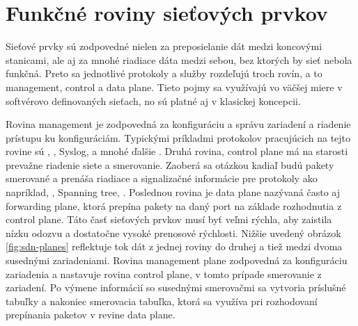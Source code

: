 \section{Funkčné roviny sieťových prvkov}
Sieťové prvky sú zodpovedné nielen za preposielanie dát medzi koncovými stanicami, ale aj za mnohé riadiace dáta medzi sebou, bez ktorých by sieť nebola funkčná. Preto sa jednotlivé protokoly a služby rozdeľujú troch rovín, a to management, control a data plane. Tieto pojmy sa využívajú vo väčšej miere v softvérovo definovaných sieťach, no sú platné aj v klasickej koncepcii.
 
Rovina management je zodpovedná za konfiguráciu a správu zariadení a riadenie prístupu ku konfiguráciám. Typickými príkladmi protokolov pracujúcich na tejto rovine sú , , Syslog,  a mnohé ďalšie \cite{Singh2018}. Druhá rovina, control plane má na starosti prevažne riadenie siete a smerovanie. Zaoberá sa otázkou kadiaľ budú pakety smerované a prenáša riadiace a signalizačné informácie pre protokoly ako napríklad, , Spanning tree,  \cite{Singh2018}. Poslednou rovina je data plane nazývaná často aj forwarding plane, ktorá prepína pakety na daný port na základe rozhodnutia z control plane. Táto časť sieťových prvkov musí byť veľmi rýchla, aby zaistila nízku odozvu a dostatočne vysoké prenosové rýchlosti. Nižšie uvedený obrázok \ref{fig:sdn-planes} reflektuje tok dát z jednej roviny do druhej a tiež medzi dvoma susednými zariadeniami. Rovina management plane zodpovedná za konfiguráciu zariadenia a nastavuje rovina control plane, v tomto prípade smerovanie z zariadení. Po výmene informácií so susednými smerovačmi sa vytvoria príslušné tabuľky a nakoniec smerovacia tabuľka, ktorá sa využíva pri rozhodovaní prepínania paketov v revine data plane.

